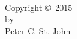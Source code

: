 \thispagestyle{empty}
\null
\vfill
\begin{center}
  \thetitle\\[2ex]
  Copyright \copyright \ 2015\\
  by\\
  Peter C. St. John
\end{center}
\clearpage
